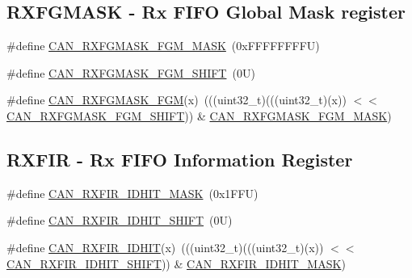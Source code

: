 \subsection*{R\+X\+F\+G\+M\+A\+SK -\/ Rx F\+I\+FO Global Mask register}
\begin{DoxyCompactItemize}
\item 
\#define \mbox{\hyperlink{group___c_a_n___register___masks_ga5db0253c73d24a846f3f3ce6cd67e74c}{C\+A\+N\+\_\+\+R\+X\+F\+G\+M\+A\+S\+K\+\_\+\+F\+G\+M\+\_\+\+M\+A\+SK}}~(0x\+F\+F\+F\+F\+F\+F\+F\+F\+U)
\item 
\#define \mbox{\hyperlink{group___c_a_n___register___masks_ga65e590b20d692e367f4ee9dc8a4585e2}{C\+A\+N\+\_\+\+R\+X\+F\+G\+M\+A\+S\+K\+\_\+\+F\+G\+M\+\_\+\+S\+H\+I\+FT}}~(0\+U)
\item 
\#define \mbox{\hyperlink{group___c_a_n___register___masks_ga15b1e73fac26a60dd1247901ed012e02}{C\+A\+N\+\_\+\+R\+X\+F\+G\+M\+A\+S\+K\+\_\+\+F\+GM}}(x)~(((uint32\+\_\+t)(((uint32\+\_\+t)(x)) $<$$<$ \mbox{\hyperlink{group___c_a_n___register___masks_ga65e590b20d692e367f4ee9dc8a4585e2}{C\+A\+N\+\_\+\+R\+X\+F\+G\+M\+A\+S\+K\+\_\+\+F\+G\+M\+\_\+\+S\+H\+I\+FT}})) \& \mbox{\hyperlink{group___c_a_n___register___masks_ga5db0253c73d24a846f3f3ce6cd67e74c}{C\+A\+N\+\_\+\+R\+X\+F\+G\+M\+A\+S\+K\+\_\+\+F\+G\+M\+\_\+\+M\+A\+SK}})
\end{DoxyCompactItemize}
\subsection*{R\+X\+F\+IR -\/ Rx F\+I\+FO Information Register}
\begin{DoxyCompactItemize}
\item 
\#define \mbox{\hyperlink{group___c_a_n___register___masks_ga097ddfd77b23ddd23341d8ea269ce64b}{C\+A\+N\+\_\+\+R\+X\+F\+I\+R\+\_\+\+I\+D\+H\+I\+T\+\_\+\+M\+A\+SK}}~(0x1\+F\+F\+U)
\item 
\#define \mbox{\hyperlink{group___c_a_n___register___masks_ga6a1b5e43de75851c0bdc5690c1715a14}{C\+A\+N\+\_\+\+R\+X\+F\+I\+R\+\_\+\+I\+D\+H\+I\+T\+\_\+\+S\+H\+I\+FT}}~(0\+U)
\item 
\#define \mbox{\hyperlink{group___c_a_n___register___masks_ga8b2cdf4be2403ad67220d43309a7ab91}{C\+A\+N\+\_\+\+R\+X\+F\+I\+R\+\_\+\+I\+D\+H\+IT}}(x)~(((uint32\+\_\+t)(((uint32\+\_\+t)(x)) $<$$<$ \mbox{\hyperlink{group___c_a_n___register___masks_ga6a1b5e43de75851c0bdc5690c1715a14}{C\+A\+N\+\_\+\+R\+X\+F\+I\+R\+\_\+\+I\+D\+H\+I\+T\+\_\+\+S\+H\+I\+FT}})) \& \mbox{\hyperlink{group___c_a_n___register___masks_ga097ddfd77b23ddd23341d8ea269ce64b}{C\+A\+N\+\_\+\+R\+X\+F\+I\+R\+\_\+\+I\+D\+H\+I\+T\+\_\+\+M\+A\+SK}})
\end{DoxyCompactItemize}
